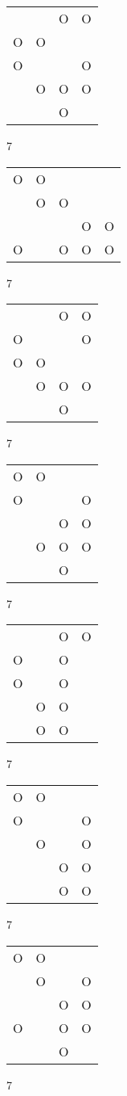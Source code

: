\begin{tabular}{|m{0.2cm}m{0.2cm}m{0.2cm}m{0.2cm}|}\hline
 & &O&O\\
O&O& & \\
O& & &O\\
 &O&O&O\\
 & &O& \\
\hline\end{tabular}7
\begin{tabular}{|m{0.2cm}m{0.2cm}m{0.2cm}m{0.2cm}m{0.2cm}|}\hline
O&O& & & \\
 &O&O& & \\
 & & &O&O\\
O& &O&O&O\\
\hline\end{tabular}7
\begin{tabular}{|m{0.2cm}m{0.2cm}m{0.2cm}m{0.2cm}|}\hline
 & &O&O\\
O& & &O\\
O&O& & \\
 &O&O&O\\
 & &O& \\
\hline\end{tabular}7
\begin{tabular}{|m{0.2cm}m{0.2cm}m{0.2cm}m{0.2cm}|}\hline
O&O& & \\
O& & &O\\
 & &O&O\\
 &O&O&O\\
 & &O& \\
\hline\end{tabular}7
\begin{tabular}{|m{0.2cm}m{0.2cm}m{0.2cm}m{0.2cm}|}\hline
 & &O&O\\
O& &O& \\
O& &O& \\
 &O&O& \\
 &O&O& \\
\hline\end{tabular}7
\begin{tabular}{|m{0.2cm}m{0.2cm}m{0.2cm}m{0.2cm}|}\hline
O&O& & \\
O& & &O\\
 &O& &O\\
 & &O&O\\
 & &O&O\\
\hline\end{tabular}7
\begin{tabular}{|m{0.2cm}m{0.2cm}m{0.2cm}m{0.2cm}|}\hline
O&O& & \\
 &O& &O\\
 & &O&O\\
O& &O&O\\
 & &O& \\
\hline\end{tabular}7
